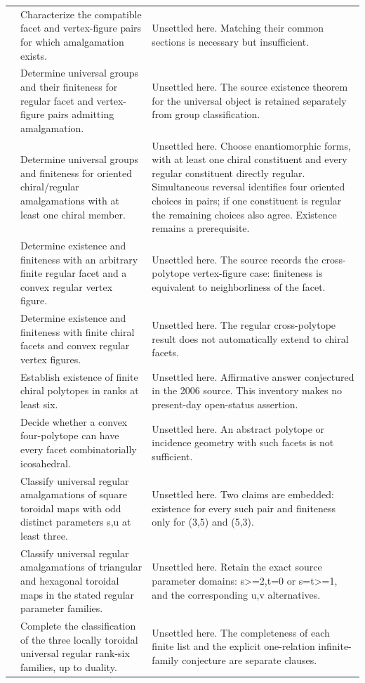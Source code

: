 \begin{longtable}{@{}>{\raggedright\arraybackslash}p{}>{\raggedright\arraybackslash}p{}>{\raggedright\arraybackslash}p{}@{}}
9 & Characterize the compatible facet and vertex-figure pairs for which amalgamation exists. & Unsettled here. Matching their common sections is necessary but insufficient.\\[5pt]
10 & Determine universal groups and their finiteness for regular facet and vertex-figure pairs admitting amalgamation. & Unsettled here. The source existence theorem for the universal object is retained separately from group classification.\\[5pt]
11 & Determine universal groups and finiteness for oriented chiral/regular amalgamations with at least one chiral member. & Unsettled here. Choose enantiomorphic forms, with at least one chiral constituent and every regular constituent directly regular. Simultaneous reversal identifies four oriented choices in pairs; if one constituent is regular the remaining choices also agree. Existence remains a prerequisite.\\[5pt]
12 & Determine existence and finiteness with an arbitrary finite regular facet and a convex regular vertex figure. & Unsettled here. The source records the cross-polytope vertex-figure case: finiteness is equivalent to neighborliness of the facet.\\[5pt]
13 & Determine existence and finiteness with finite chiral facets and convex regular vertex figures. & Unsettled here. The regular cross-polytope result does not automatically extend to chiral facets.\\[5pt]
14 & Establish existence of finite chiral polytopes in ranks at least six. & Unsettled here. Affirmative answer conjectured in the 2006 source. This inventory makes no present-day open-status assertion.\\[5pt]
15 & Decide whether a convex four-polytope can have every facet combinatorially icosahedral. & Unsettled here. An abstract polytope or incidence geometry with such facets is not sufficient.\\[5pt]
16 & Classify universal regular amalgamations of square toroidal maps with odd distinct parameters s,u at least three. & Unsettled here. Two claims are embedded: existence for every such pair and finiteness only for (3,5) and (5,3).\\[5pt]
17 & Classify universal regular amalgamations of triangular and hexagonal toroidal maps in the stated regular parameter families. & Unsettled here. Retain the exact source parameter domains: s>=2,t=0 or s=t>=1, and the corresponding u,v alternatives.\\[5pt]
18 & Complete the classification of the three locally toroidal universal regular rank-six families, up to duality. & Unsettled here. The completeness of each finite list and the explicit one-relation infinite-family conjecture are separate clauses.\\[5pt]

\end{longtable}
